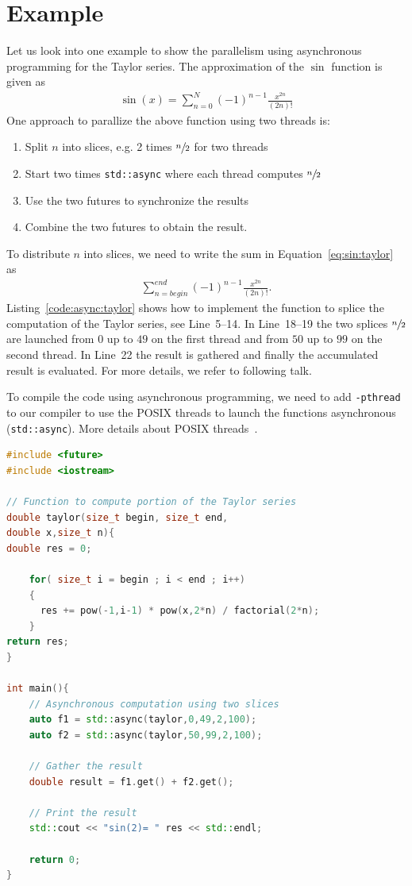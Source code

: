 \documentclass[11pt,fleqn]{book} %
\begin{document}
\section*{Example}
Let us look into one example to show the parallelism using asynchronous programming for the Taylor series. The approximation of the $\sin$ function is given as
\begin{align}
\sin(x) = \sum\limits_{n=0}^N (-1)^{n-1} \frac{x^{2n}}{(2n)!} 
\label{eq:sin:taylor}
\end{align}
One approach to parallize the above function using two threads is:
\begin{enumerate}
\item Split $n$ into slices, e.g. 2 times $\sfrac{n}{2}$ for two threads
\item Start two times \lstinline|std::async| where each thread computes $\sfrac{n}{2}$
\item Use the two futures to synchronize the results
\item Combine the two futures to obtain the result.
\end{enumerate}
To distribute $n$ into slices, we need to write the sum in Equation~\eqref{eq:sin:taylor} as
\begin{align}
\sum\limits_{n=begin}^{end} (-1)^{n-1} \frac{x^{2n}}{(2n)!} \text{.}
\end{align}
Listing~\ref{code:async:taylor} shows how to implement the function to splice the computation of the Taylor series, see Line~5--14. In Line~18--19 the two splices $\sfrac{n}{2}$ are launched from $0$ up to $49$ on the first thread and from $50$ up to $99$ on the second thread. In Line~22 the result is gathered and finally the accumulated result is evaluated. For more details, we refer to following talk.

To compile the code using asynchronous programming, we need to add \lstinline|-pthread| to our compiler to use the POSIX threads to launch the functions asynchronous (\lstinline|std::async|). More details about POSIX threads~\cite{butenhof1997programming,kleiman1996programming}.




\begin{lstlisting}[language=c++,caption={Asynchronous computation of the $\sin$ function using a Taylor series.\label{code:async:taylor}},float,floatplacement=tb]
#include <future>
#include <iostream>

// Function to compute portion of the Taylor series
double taylor(size_t begin, size_t end, 
double x,size_t n){
double res = 0;

	for( size_t i = begin ; i < end ; i++)
	{
	  res += pow(-1,i-1) * pow(x,2*n) / factorial(2*n);
	} 
return res;
}

int main(){
	// Asynchronous computation using two slices
	auto f1 = std::async(taylor,0,49,2,100); 
	auto f2 = std::async(taylor,50,99,2,100); 
	
	// Gather the result
	double result = f1.get() + f2.get();

	// Print the result
	std::cout << "sin(2)= " res << std::endl;

	return 0;
}
\end{lstlisting}
\end{document}
